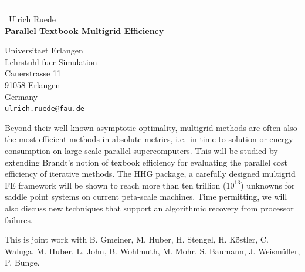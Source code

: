 \documentclass{report}
\begin{document}
\begin{center}
\rule{6in}{1pt} \
{\large Ulrich Ruede \\
{\bf Parallel Textbook Multigrid Efficiency}}

Universitaet Erlangen \\ Lehrstuhl fuer Simulation \\ Cauerstrasse 11 \\ 91058 Erlangen \\ Germany
\\
{\tt ulrich.ruede@fau.de}\end{center}

Beyond their well-known asymptotic optimality, multigrid methods
are often also the most efficient methods in absolute metrics,
i.e.\ in time to solution or energy consumption
on large scale parallel supercomputers. This will be studied by
extending Brandt's notion of texbook efficiency for
evaluating the parallel cost efficiency of iterative methods.
The HHG package, a carefully designed multigrid FE framework
will be shown to reach more than ten trillion ($10^{13}$) unknowns
for saddle point systems on current peta-scale machines.
Time permitting, we will also discuss
new techniques that support an algorithmic
recovery from processor failures.

This is joint work with B. Gmeiner, M. Huber, H. Stengel, H. K{\"o}stler,
C. Waluga, M. Huber, L. John, B. Wohlmuth,
M. Mohr, S. Baumann, J. Weism{\"u}ller, P. Bunge.
\end{document}
